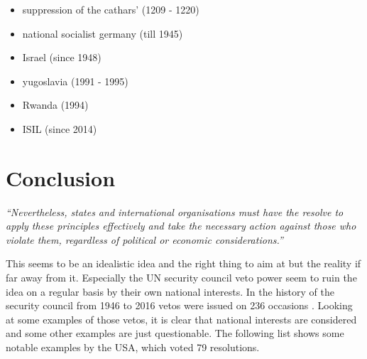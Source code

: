 \begin{itemize}
\item suppression of the cathars' (1209 - 1220)
\item national socialist germany (till 1945)
\item Israel (since 1948)
\item yugoslavia (1991 - 1995)
\item Rwanda (1994)
\item ISIL (since 2014)
\end{itemize}

\section{Conclusion}
\emph{``Nevertheless, states and international organisations must have the
resolve to apply these principles effectively and take the necessary
action against those who violate them, regardless of political or
economic considerations.''}
\cite[p. 37]{tfohr}

This seems to be an idealistic idea and the right thing to aim at but the
reality if far away from it. Especially the UN security council veto power
seem to ruin the idea on a regular basis by their own national interests.
In the history of the security council from 1946 to 2016 vetos were issued
on 236 occasions \cite{veto}. Looking at some examples of those vetos, it
is clear that national interests are considered and some other examples
are just questionable. The following list shows some notable examples
by the USA, which voted 79 resolutions.

